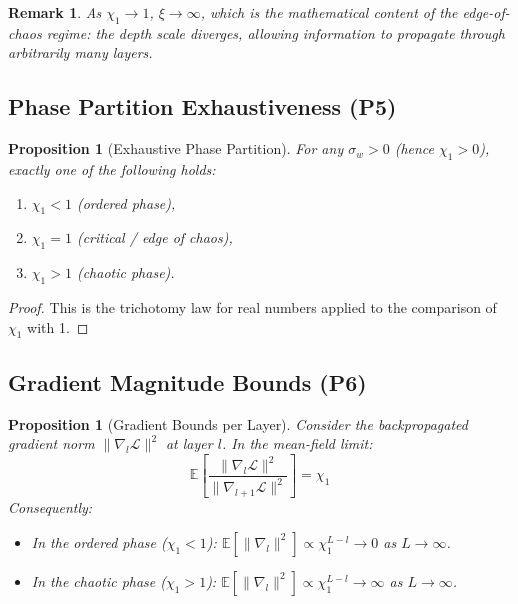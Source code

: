 \documentclass[10pt]{article}
\newcommand{\EE}{\mathbb{E}}
\newtheorem{proposition}[theorem]{Proposition}
\newtheorem{remark}[theorem]{Remark}
\begin{document}
\begin{remark}
As $\chi_1 \to 1$, $\xi \to \infty$, which is the mathematical content of the edge-of-chaos regime: the depth scale diverges, allowing information to propagate through arbitrarily many layers.
\end{remark}

\subsection{Phase Partition Exhaustiveness (P5)}

\begin{proposition}[Exhaustive Phase Partition]
For any $\sigma_w > 0$ (hence $\chi_1 > 0$), exactly one of the following holds:
\begin{enumerate}[nosep]
    \item $\chi_1 < 1$ (ordered phase),
    \item $\chi_1 = 1$ (critical / edge of chaos),
    \item $\chi_1 > 1$ (chaotic phase).
\end{enumerate}
\end{proposition}

\begin{proof}
This is the trichotomy law for real numbers applied to the comparison of $\chi_1$ with 1.
\end{proof}

\subsection{Gradient Magnitude Bounds (P6)}

\begin{proposition}[Gradient Bounds per Layer]
\label{prop:gradient-bounds}
Consider the backpropagated gradient norm $\|\nabla_l \mathcal{L}\|^2$ at layer $l$.
In the mean-field limit:
\begin{equation}
    \EE\left[\frac{\|\nabla_l \mathcal{L}\|^2}{\|\nabla_{l+1} \mathcal{L}\|^2}\right] = \chi_1
\end{equation}
Consequently:
\begin{itemize}[nosep]
    \item In the ordered phase ($\chi_1 < 1$): $\EE[\|\nabla_l\|^2] \propto \chi_1^{L-l} \to 0$ as $L \to \infty$.
    \item In the chaotic phase ($\chi_1 > 1$): $\EE[\|\nabla_l\|^2] \propto \chi_1^{L-l} \to \infty$ as $L \to \infty$.
\end{itemize}
\end{proposition}
\end{document}

